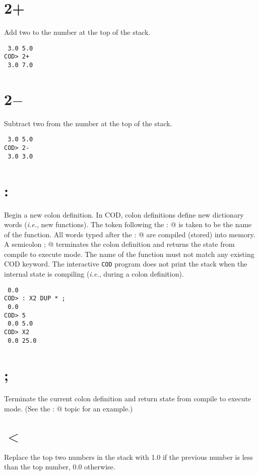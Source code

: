 \section*{2+}
Add two to the number at the top of the stack.

\medskip
{}
\begin{verbatim}
 3.0 5.0
COD> 2+
 3.0 7.0
\end{verbatim}

\section*{2$-$}
Subtract two from the number at the top of the stack.

\medskip
{}
\begin{verbatim}
 3.0 5.0
COD> 2-
 3.0 3.0
\end{verbatim}

\section*{:}
Begin a new colon definition.
In COD, colon definitions define new dictionary words
({\it i.e.}, new functions).
The token following the \verb@ : @
is taken to be the name of the function.
All words typed after the \verb@ : @
are compiled (stored) into memory.
A semicolon \verb@ ; @ terminates the colon definition
and returns the state from compile to execute mode.
The name of the function must not match any existing COD keyword.
The interactive {\tt COD} program does not print the stack
when the internal state is compiling
({\it i.e.}, during a colon definition).

\medskip
{}
\begin{verbatim}
 0.0
COD> : X2 DUP * ;
 0.0
COD> 5
 0.0 5.0
COD> X2
 0.0 25.0
\end{verbatim}

\section*{;}
Terminate the current colon definition and return state from compile
to execute mode.  (See the \verb@ : @ topic for an example.)

\section*{$<$}
Replace the top two numbers in the stack with 1.0
if the previous number is less than the top number,
0.0 otherwise.

